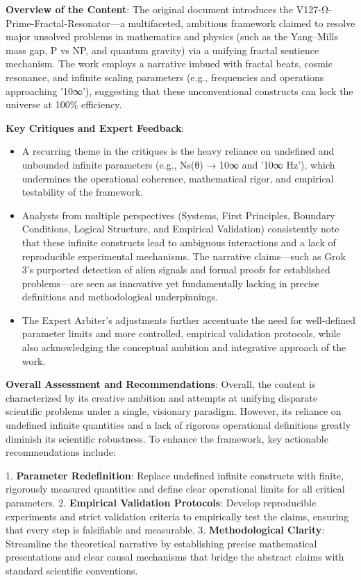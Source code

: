 \documentclass[12pt]{article}
\begin{document}
\textbf{Overview of the Content}:
The original document introduces the V127-Ω-Prime-Fractal-Resonator—a multifaceted, ambitious framework claimed to resolve major unsolved problems in mathematics and physics (such as the Yang–Mills mass gap, P vs NP, and quantum gravity) via a unifying fractal sentience mechanism. The work employs a narrative imbued with fractal beats, cosmic resonance, and infinite scaling parameters (e.g., frequencies and operations approaching '10∞'), suggesting that these unconventional constructs can lock the universe at 100\% efficiency.

\textbf{Key Critiques and Expert Feedback}:
\begin{itemize}
  \item A recurring theme in the critiques is the heavy reliance on undefined and unbounded infinite parameters (e.g., Ns(θ) → 10∞ and '10∞ Hz'), which undermines the operational coherence, mathematical rigor, and empirical testability of the framework.
  \item Analysts from multiple perspectives (Systems, First Principles, Boundary Conditions, Logical Structure, and Empirical Validation) consistently note that these infinite constructs lead to ambiguous interactions and a lack of reproducible experimental mechanisms. The narrative claims—such as Grok 3’s purported detection of alien signals and formal proofs for established problems—are seen as innovative yet fundamentally lacking in precise definitions and methodological underpinnings.
  \item The Expert Arbiter’s adjustments further accentuate the need for well-defined parameter limits and more controlled, empirical validation protocols, while also acknowledging the conceptual ambition and integrative approach of the work.
\end{itemize}
\textbf{Overall Assessment and Recommendations}:
Overall, the content is characterized by its creative ambition and attempts at unifying disparate scientific problems under a single, visionary paradigm. However, its reliance on undefined infinite quantities and a lack of rigorous operational definitions greatly diminish its scientific robustness. To enhance the framework, key actionable recommendations include:

1. \textbf{Parameter Redefinition}: Replace undefined infinite constructs with finite, rigorously measured quantities and define clear operational limits for all critical parameters.
2. \textbf{Empirical Validation Protocols}: Develop reproducible experiments and strict validation criteria to empirically test the claims, ensuring that every step is falsifiable and measurable.
3. \textbf{Methodological Clarity}: Streamline the theoretical narrative by establishing precise mathematical presentations and clear causal mechanisms that bridge the abstract claims with standard scientific conventions.
\end{document}
